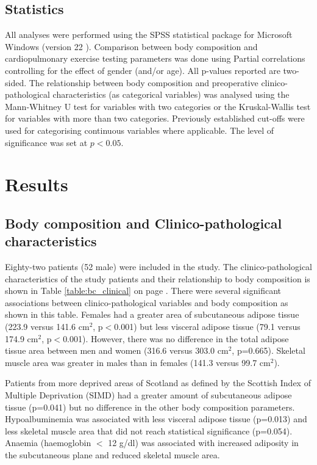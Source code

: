 \subsection{Statistics}

All analyses were performed using the SPSS statistical package for Microsoft Windows (version 22 ). Comparison between body composition and cardiopulmonary exercise testing parameters was done using Partial correlations controlling for the effect of gender (and/or age). All p-values reported are two-sided. The relationship between body composition and preoperative clinico-pathological characteristics (as categorical variables) was analysed using the Mann-Whitney U test for variables with two categories or the Kruskal-Wallis test for variables with more than two categories. Previously established cut-offs were used for categorising continuous variables where applicable. The level of significance was set at $p<0.05$.

\clearpage
\section{Results}

\subsection{Body composition and Clinico-pathological characteristics}
Eighty-two patients (52 male) were included in the study. 
The clinico-pathological characteristics of the study patients and their relationship to body composition is shown in Table \ref{table:bc_clinical} on page \pageref{table:bc_clinical}. 
There were several significant associations between clinico-pathological variables and body composition as shown in this table. 
Females had a greater area of subcutaneous adipose tissue (223.9 versus 141.6 cm$^2$, p$<$0.001) but less visceral adipose tissue (79.1 versus 174.9 cm$^2$, p$<$0.001).
However, there was no difference in the total adipose tissue area between men and women (316.6 versus 303.0 cm$^2$, p=0.665).
Skeletal muscle area was greater in males than in females (141.3 versus 99.7 cm$^2$).

Patients from more deprived areas of Scotland as defined by the Scottish Index of Multiple Deprivation (SIMD) had a greater amount of subcutaneous adipose tissue (p=0.041) but no difference in the other body composition parameters.
Hypoalbuminemia was associated with less visceral adipose tissue (p=0.013) and less skeletal muscle area that did not reach statistical significance (p=0.054). 
Anaemia (haemoglobin $<$ 12 g/dl) was associated with increased adiposity in the subcutaneous plane and reduced skeletal muscle area. 
	

